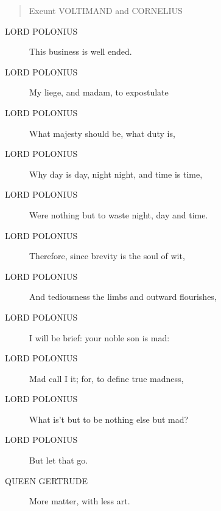 \documentclass{article}
\begin{document}
\begin{quote}
Exeunt VOLTIMAND and CORNELIUS
\end{quote}
          
\begin{description}
            
\item[LORD POLONIUS] This business is well ended.
\item[LORD POLONIUS] My liege, and madam, to expostulate
\item[LORD POLONIUS] What majesty should be, what duty is,
\item[LORD POLONIUS] Why day is day, night night, and time is time,
\item[LORD POLONIUS] Were nothing but to waste night, day and time.
\item[LORD POLONIUS] Therefore, since brevity is the soul of wit,
\item[LORD POLONIUS] And tediousness the limbs and outward flourishes,
\item[LORD POLONIUS] I will be brief: your noble son is mad:
\item[LORD POLONIUS] Mad call I it; for, to define true madness,
\item[LORD POLONIUS] What is't but to be nothing else but mad?
\item[LORD POLONIUS] But let that go.
\end{description}
          
\begin{description}
            
\item[QUEEN GERTRUDE] More matter, with less art.
\end{description}
          
\end{document}

